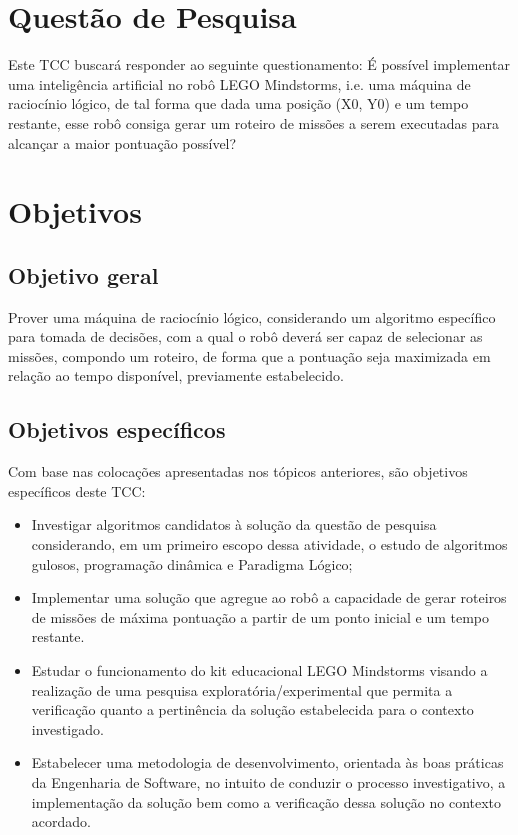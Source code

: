 \section{Questão de Pesquisa}

Este TCC buscará responder ao seguinte questionamento: É possível implementar uma inteligência artificial no robô LEGO Mindstorms, i.e. uma máquina de raciocínio lógico, de tal forma que dada uma posição (X0, Y0) e um tempo restante, esse robô consiga gerar um roteiro de missões a serem executadas para alcançar a maior pontuação possível?

\section{Objetivos}

\subsection{Objetivo geral}
Prover uma máquina de raciocínio lógico, considerando um algoritmo específico para tomada de decisões, com a qual o robô deverá ser capaz de selecionar as missões, compondo um roteiro, de forma que a pontuação seja maximizada em relação ao tempo disponível, previamente estabelecido.

\subsection{Objetivos específicos}
Com base nas colocações apresentadas nos tópicos anteriores, são objetivos específicos deste TCC:
\begin{itemize}
\item Investigar algoritmos candidatos à solução da questão de pesquisa considerando, em um primeiro escopo dessa atividade, o estudo de algoritmos gulosos, programação dinâmica e Paradigma Lógico;
\item Implementar uma solução que agregue ao robô a capacidade de gerar roteiros de missões de máxima pontuação a partir de um ponto inicial e um tempo restante.
\item Estudar o funcionamento do kit educacional LEGO Mindstorms visando a realização de uma pesquisa exploratória/experimental que permita a verificação quanto a pertinência da solução estabelecida para o contexto investigado.
\item Estabelecer uma metodologia de desenvolvimento, orientada às boas práticas da Engenharia de Software, no intuito de conduzir o processo investigativo, a implementação da solução bem como a verificação dessa solução no contexto acordado.
\end{itemize}

